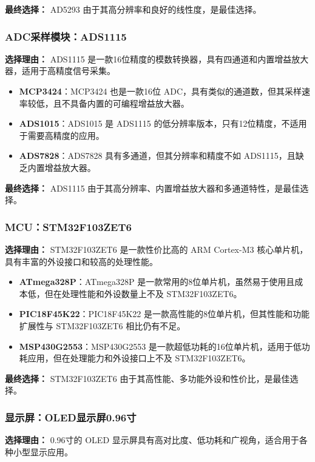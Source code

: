 \documentclass[lang=cn,11pt,a4paper]{elegantpaper}
\begin{document}
\textbf{最终选择：} AD5293 由于其高分辨率和良好的线性度，是最佳选择。

\subsubsection{ADC采样模块：ADS1115}
\textbf{选择理由：} ADS1115 是一款16位精度的模数转换器，具有四通道和内置增益放大器，适用于高精度信号采集。

\begin{itemize}
  \item \textbf{MCP3424}：MCP3424 也是一款16位 ADC，具有类似的通道数，但其采样速率较低，且不具备内置的可编程增益放大器。
  \item \textbf{ADS1015}：ADS1015 是 ADS1115 的低分辨率版本，只有12位精度，不适用于需要高精度的应用。
  \item \textbf{ADS7828}：ADS7828 具有多通道，但其分辨率和精度不如 ADS1115，且缺乏内置增益放大器。
\end{itemize}

\textbf{最终选择：} ADS1115 由于其高分辨率、内置增益放大器和多通道特性，是最佳选择。

\subsubsection{MCU：STM32F103ZET6}
\textbf{选择理由：} STM32F103ZET6 是一款性价比高的 ARM Cortex-M3 核心单片机，具有丰富的外设接口和较高的处理性能。

\begin{itemize}
  \item \textbf{ATmega328P}：ATmega328P 是一款常用的8位单片机，虽然易于使用且成本低，但在处理性能和外设数量上不及 STM32F103ZET6。
  \item \textbf{PIC18F45K22}：PIC18F45K22 是一款高性能的8位单片机，但其性能和功能扩展性与 STM32F103ZET6 相比仍有不足。
  \item \textbf{MSP430G2553}：MSP430G2553 是一款超低功耗的16位单片机，适用于低功耗应用，但在处理能力和外设接口上不及 STM32F103ZET6。
\end{itemize}

\textbf{最终选择：} STM32F103ZET6 由于其高性能、多功能外设和性价比，是最佳选择。

\subsubsection{显示屏：OLED显示屏0.96寸}
\textbf{选择理由：} 0.96寸的 OLED 显示屏具有高对比度、低功耗和广视角，适合用于各种小型显示应用。
\end{document}
